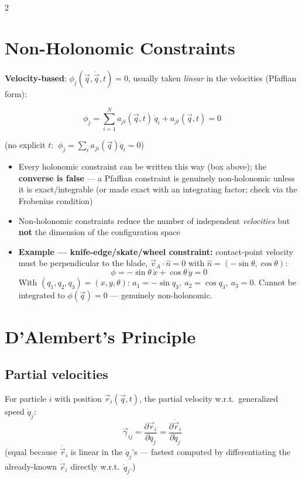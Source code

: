 \documentclass[10pt]{article}
\begin{document}
\begin{multicols}{2}
\section*{Non-Holonomic Constraints}
\textbf{Velocity-based}: $\phi_j(\vec q,\dot{\vec q},t)=0$, usually taken \emph{linear} in the velocities (Pfaffian form):
\begin{keybox}
\[
    \phi_j=\sum_{i=1}^{N}a_{ji}(\vec q,t)\,\dot q_i+a_{jt}(\vec q,t)=0
\]
\end{keybox}
(no explicit $t$: $\ \phi_j=\sum_i a_{ji}(\vec q)\dot q_i=0$)
\begin{itemize}[nosep, leftmargin=1.1em]
    \item Every holonomic constraint can be written this way (box above); the \textbf{converse is false} --- a Pfaffian constraint is genuinely non-holonomic unless it is exact/integrable (or made exact with an integrating factor; check via the Frobenius condition)
    \item Non-holonomic constraints reduce the number of independent \emph{velocities} but \textbf{not} the dimension of the configuration space
    \item \textbf{Example --- knife-edge/skate/wheel constraint:} contact-point velocity must be perpendicular to the blade, $\vec v_A\cdot\hat n=0$ with $\hat n=(-\sin\theta,\cos\theta)$:
    \[
        \phi=-\sin\theta\,\dot x+\cos\theta\,\dot y=0
    \]
    With $(q_1,q_2,q_3)=(x,y,\theta)$: $a_1=-\sin q_3,\ a_2=\cos q_3,\ a_3=0$. Cannot be integrated to $\phi(\vec q)=0$ --- genuinely non-holonomic.
\end{itemize}

\section*{D'Alembert's Principle}
\subsection*{Partial velocities}
For particle $i$ with position $\vec r_i(\vec q,t)$, the partial velocity w.r.t.\ generalized speed $\dot q_j$:
\[
    \vec\gamma_{ij}=\frac{\partial\vec r_i}{\partial q_j}=\frac{\partial\dot{\vec r}_i}{\partial\dot q_j}
\]
(equal because $\dot{\vec r}_i$ is linear in the $\dot q_j$'s --- fastest computed by differentiating the already-known $\dot{\vec r}_i$ directly w.r.t.\ $\dot q_j$.)


\end{multicols}
\end{document}

